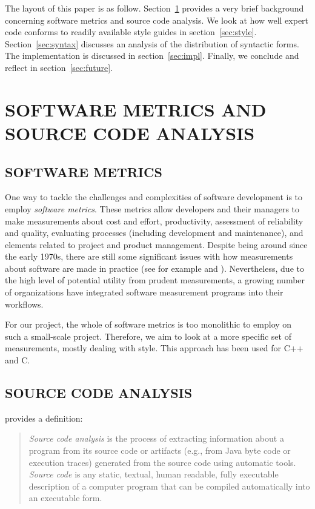 \documentclass[12pt,abstracton]{scrartcl}
\begin{document}
The layout of this paper is as follow.
Section~\ref{sec:metric} provides a very brief background
concerning software metrics and source code analysis.
We look at how well expert code conforms to readily available
style guides in section~\ref{sec:style}.
Section~\ref{sec:syntax} discusses an analysis
of the distribution of syntactic forms. The implementation is discussed
in section~\ref{sec:impl}. Finally, we conclude and reflect in section~\ref{sec:future}.
\section{SOFTWARE METRICS AND SOURCE CODE ANALYSIS}\label{sec:metric}
\subsection{SOFTWARE METRICS}
One way to tackle the challenges and complexities of software development is to employ
\emph{software metrics}. These metrics allow developers and their managers to make
measurements about cost and effort, productivity, assessment of reliability and
quality, evaluating processes (including development and maintenance), and elements
related to project and product management.\cite{Ord08} Despite being around since
the early 1970s, there are still some significant issues with how measurements
about software are made in practice (see for example \cite{Jon94} and \cite{Bou12}).
Nevertheless, due to the high level of potential utility from prudent measurements,
a growing number of organizations have integrated software measurement programs into
their workflows.\cite{Ord08}

For our project, the whole of software metrics is too monolithic to employ on
such a small-scale project. Therefore, we aim to look at a more specific set of measurements,
mostly dealing with style. This approach has been used for C++\cite{Aye98} and C\cite{Tak11}.
\subsection{SOURCE CODE ANALYSIS}
\cite{Bin07} provides a definition:
\begin{quote}
\emph{Source code analysis} is the process of extracting
information about a program from its source code
or artifacts (e.g., from Java byte code or execution
traces) generated from the source code using automatic tools.
\emph{Source code} is any static, textual,
human readable, fully executable description of
a computer program that can be compiled automatically into an executable form.
\end{quote}
\end{document}
